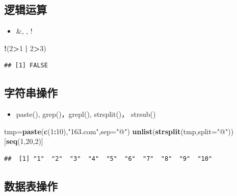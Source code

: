 \documentclass[]{book}
\newenvironment{Shaded}{\begin{snugshade}}{\end{snugshade}}
\newcommand{\DataTypeTok}[1]{\textcolor[rgb]{0.13,0.29,0.53}{#1}}
\newcommand{\DecValTok}[1]{\textcolor[rgb]{0.00,0.00,0.81}{#1}}
\newcommand{\KeywordTok}[1]{\textcolor[rgb]{0.13,0.29,0.53}{\textbf{#1}}}
\newcommand{\NormalTok}[1]{#1}
\newcommand{\OperatorTok}[1]{\textcolor[rgb]{0.81,0.36,0.00}{\textbf{#1}}}
\newcommand{\StringTok}[1]{\textcolor[rgb]{0.31,0.60,0.02}{#1}}
\providecommand{\tightlist}{%
  \setlength{\itemsep}{0pt}\setlength{\parskip}{0pt}}
\begin{document}
\hypertarget{section-11}{%
\subsection{逻辑运算}\label{section-11}}

\begin{itemize}
\tightlist
\item
  \&, \textbar{}, !
\end{itemize}

\begin{Shaded}
\begin{Highlighting}[]
\OperatorTok{!}\NormalTok{(}\DecValTok{2}\OperatorTok{>}\DecValTok{1} \OperatorTok{|}\StringTok{ }\DecValTok{2}\OperatorTok{>}\DecValTok{3}\NormalTok{)}
\end{Highlighting}
\end{Shaded}

\begin{verbatim}
## [1] FALSE
\end{verbatim}

\hypertarget{section-12}{%
\subsection{字符串操作}\label{section-12}}

\begin{itemize}
\tightlist
\item
  paste(), grep()，grepl(), strsplit()， strsub()
\end{itemize}

\begin{Shaded}
\begin{Highlighting}[]
\NormalTok{tmp=}\KeywordTok{paste}\NormalTok{(}\KeywordTok{c}\NormalTok{(}\DecValTok{1}\OperatorTok{:}\DecValTok{10}\NormalTok{),}\StringTok{"163.com"}\NormalTok{,}\DataTypeTok{sep=}\StringTok{"@"}\NormalTok{)}
\KeywordTok{unlist}\NormalTok{(}\KeywordTok{strsplit}\NormalTok{(tmp,}\DataTypeTok{split=}\StringTok{"@"}\NormalTok{))[}\KeywordTok{seq}\NormalTok{(}\DecValTok{1}\NormalTok{,}\DecValTok{20}\NormalTok{,}\DecValTok{2}\NormalTok{)]}
\end{Highlighting}
\end{Shaded}

\begin{verbatim}
##  [1] "1"  "2"  "3"  "4"  "5"  "6"  "7"  "8"  "9"  "10"
\end{verbatim}

\hypertarget{section-13}{%
\subsection{数据表操作}\label{section-13}}
\end{document}
